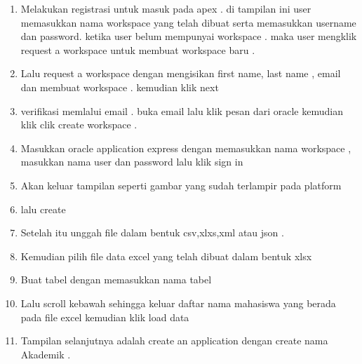 \begin{enumerate}
    \item Melakukan registrasi untuk masuk pada apex . di tampilan ini user memasukkan nama workspace yang telah dibuat serta memasukkan username dan password. ketika user belum mempunyai workspace . maka user mengklik request a workspace untuk membuat workspace baru .
\newline

    \item   Lalu request a workspace dengan mengisikan first name, last name
    , email dan membuat workspace . kemudian klik next 
\newline

    \item   verifikasi memlalui email . buka email lalu klik pesan dari oracle kemudian klik clik create workspace .
\newline

    \item   Masukkan oracle application express dengan memasukkan nama workspace , masukkan nama user dan password lalu klik sign in
\newline

    \item  Akan keluar tampilan seperti gambar yang sudah terlampir pada platform
\newline

    \item  lalu create
\newline

    \item  Setelah itu unggah file dalam bentuk csv,xlxs,xml atau json .
\newline

    \item  Kemudian pilih file data excel yang telah dibuat dalam bentuk xlsx
\newline

    \item  Buat tabel dengan memasukkan nama tabel 
\newline

    \item  Lalu scroll kebawah sehingga keluar daftar nama mahasiswa yang berada pada file excel kemudian klik load data 
\newline

    \item  Tampilan selanjutnya adalah create an application dengan create nama Akademik .
\newline


\end{enumerate}
